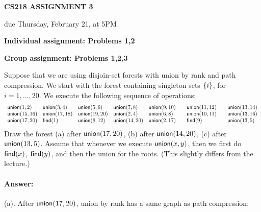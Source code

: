 \documentclass[11pt]{article}
\newcommand{\Union}{\mbox{\sf union}}
\newcommand{\Find}{\mbox{\sf find}}
\begin{document}
\centerline{\large \bf CS218 ASSIGNMENT 3}
\centerline{due Thursday, February 21, at 5PM}

\vskip 0.3in
\noindent
\bf{Individual assignment: Problems 1,2}

\noindent
\bf{Group assignment: Problems 1,2,3}

\vskip 0.2in




\begin{problem}
Suppose that we are using disjoin-set forests with union by rank and path compression. We start with the forest containing singleton sets ${\left\{ i \right\} }$, for $i = 1,\dots,20$. We execute the following sequence of operations:
%
\noindent
{\small
\begin{eqnarray*}
\begin{array}{lllllll}
\Union(1,2)\quad & \Union(3,4)\quad &\Union(5,6) \quad
    &\Union(7,8)\quad & \Union(9,10) \quad & \Union(11,12)\quad &\Union(13,14) \\
%
\Union(15,16) & \Union(17,18) &\Union(19,20) & \Union(2,4) & \Union(6,8) 
 	& \Union(10,11) & \Union(13,16) \\
%
 \Union(17,20) 	&  \Find(1) & \Union(8,12)  & \Union(14, 20)
	 & \Union(2,17) & \Find(9) &  \Union(13,5)
\end{array}
\end{eqnarray*}
}
%
Draw the forest (a) after $\Union(17,20)$, (b) after $\Union(14,20)$, (c) after $\Union(13,5)$. Assume that whenever we execute $\Union(x,y)$, then we first do $\Find(x)$, $\Find(y)$, and then the union for the roots. (This slightly differs from the lecture.)
\end{problem}

\paragraph{Answer:}
(a). After $\Union(17,20)$, union by rank has a same graph as path compression:

\end{document}
